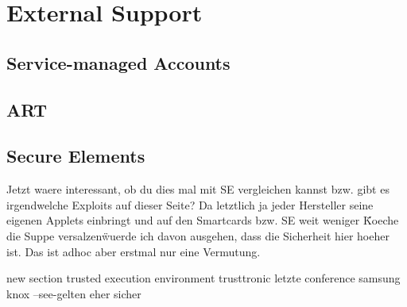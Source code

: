 \section{External Support} \label{section:evaluation-external}







\subsection{Service-managed Accounts}
\subsection{ART}
\subsection{Secure Elements}
Jetzt waere interessant, ob du dies mal mit SE vergleichen kannst bzw. gibt es irgendwelche Exploits auf dieser Seite? Da letztlich ja jeder Hersteller seine eigenen Applets einbringt und auf den Smartcards bzw. SE weit weniger \"Koeche die Suppe versalzen\" wuerde ich davon ausgehen, dass die Sicherheit hier hoeher ist. Das ist adhoc aber erstmal nur eine Vermutung.









new section trusted execution environment
trusttronic letzte conference
samsung knox
--see-gelten eher sicher

